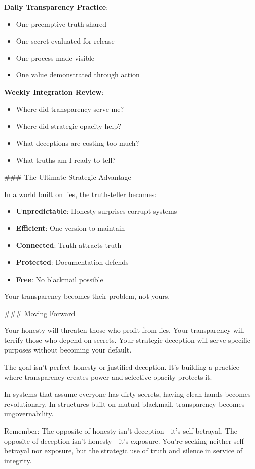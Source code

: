 \documentclass[12pt]{book}
\begin{document}
\textbf{Daily Transparency Practice}:
\begin{itemize}
\item One preemptive truth shared
\item One secret evaluated for release
\item One process made visible
\item One value demonstrated through action

\end{itemize}
\textbf{Weekly Integration Review}:
\begin{itemize}
\item Where did transparency serve me?
\item Where did strategic opacity help?
\item What deceptions are costing too much?
\item What truths am I ready to tell?

\end{itemize}
\#\#\# The Ultimate Strategic Advantage

In a world built on lies, the truth-teller becomes:

\begin{itemize}
\item \textbf{Unpredictable}: Honesty surprises corrupt systems
\item \textbf{Efficient}: One version to maintain
\item \textbf{Connected}: Truth attracts truth
\item \textbf{Protected}: Documentation defends
\item \textbf{Free}: No blackmail possible

\end{itemize}
Your transparency becomes their problem, not yours.

\#\#\# Moving Forward

Your honesty will threaten those who profit from lies. Your transparency will terrify those who depend on secrets. Your strategic deception will serve specific purposes without becoming your default.

The goal isn't perfect honesty or justified deception. It's building a practice where transparency creates power and selective opacity protects it.

In systems that assume everyone has dirty secrets, having clean hands becomes revolutionary. In structures built on mutual blackmail, transparency becomes ungovernability.

Remember: The opposite of honesty isn't deception—it's self-betrayal. The opposite of deception isn't honesty—it's exposure. You're seeking neither self-betrayal nor exposure, but the strategic use of truth and silence in service of integrity.
\end{document}
